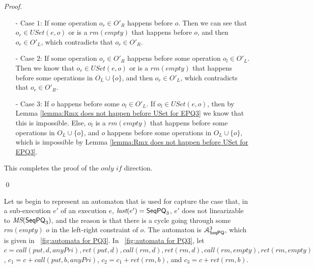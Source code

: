 \begin {proof}
\begin{itemize}
\setlength{\itemsep}{0.5pt}
\item[-] Case $1$: If some operation $o_r \in O'_R$ happens before $o$. Then we can see that $o_r \in \textit{USet}(e,o)$ or is a $\textit{rm}(\textit{empty})$ that happens before $o$, and then $o_r \in O'_L$, which contradicts that $o_r \in O'_R$.

\item[-] Case $2$: If some operation $o_r \in O'_R$ happens before some operation $o_l \in O'_L$. Then we know that $o_r \in \textit{USet}(e,o)$ or is a $\textit{rm}(\textit{empty})$ that happens before some operations in $O_L \cup \{ o \}$, and then $o_r \in O'_L$, which contradicts that $o_r \in O'_R$.

\item[-] Case $3$: If $o$ happens before some $o_l \in O'_L$. If $o_l \in \textit{USet}(e,o)$, then by Lemma \ref{lemma:Rmx does not happen before USet for EPQ3} we know that this is impossible. Else, $o_l$ is a $\textit{rm}(\textit{empty})$ that happens before some operations in $O_L \cup \{ o \}$, and $o$ happens before some operations in $O_L \cup \{ o \}$, which is impossible by Lemma \ref{lemma:Rmx does not happen before USet for EPQ3}.
\end{itemize}

This completes the proof of the $\textit{only if}$ direction.

\qed
\end {proof}

Let us begin to represent an automaton that is used for capture the case that, in a sub-execution $e'$ of an execution $e$, $\textit{last}(e')=\mathsf{SeqPQ}_3$, $e'$ does not linearizable to $\textit{MS}(\mathsf{SeqPQ}_3)$, and the reason is that there is a cycle going through some $\textit{rm}(\textit{empty})$ $o$ in the left-right constraint of $o$. The automaton is $\mathcal{A}_{\mathsf{SeqPQ}}^3$, which is given in \figurename~\ref{fig:automata for PQ3}. In \figurename~\ref{fig:automata for PQ3}, let $c = \textit{call}(\textit{put},d,\textit{anyPri}),\textit{ret}(\textit{put},d), \textit{call}(\textit{rm},d), \textit{ret}(\textit{rm},d),\textit{call}(\textit{rm},\textit{empty}),\textit{ret}(\textit{rm},\textit{empty})$, $c_1 = c + \textit{call}(\textit{put},b,\textit{anyPri})$, $c_2 = c_1 + \textit{ret}(\textit{rm},b)$, and $c_3 = c + \textit{ret}(\textit{rm},b)$.

